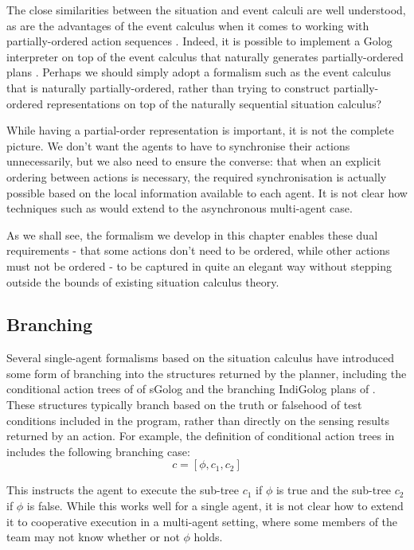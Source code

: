 The close similarities between the situation and event calculi are
well understood, as are the advantages of the event calculus when
it comes to working with partially-ordered action sequences \citep{belleghem97sitcalc_evtcalc}.
Indeed, it is possible to implement a Golog interpreter on top of
the event calculus that naturally generates partially-ordered plans
\citep{pereira04ec_golog}. Perhaps we should simply adopt a formalism
such as the event calculus that is naturally partially-ordered, rather
than trying to construct partially-ordered representations on top
of the naturally sequential situation calculus?

While having a partial-order representation is important, it is not
the complete picture. We don't want the agents to have to synchronise
their actions unnecessarily, but we also need to ensure the converse:
that when an explicit ordering between actions is necessary, the required
synchronisation is actually possible based on the local information
available to each agent. It is not clear how techniques such as \citep{pereira04ec_golog}
would extend to the asynchronous multi-agent case.

As we shall see, the formalism we develop in this chapter enables
these dual requirements - that some actions don't need to be ordered,
while other actions must not be ordered - to be captured in quite
an elegant way without stepping outside the bounds of existing situation
calculus theory.


\subsection{Branching}

Several single-agent formalisms based on the situation calculus have
introduced some form of branching into the structures returned by
the planner, including the conditional action trees of of sGolog \citep{lakemeyer99golog_cats}
and the branching IndiGolog plans of \citep{giacomo04sem_delib_indigolog}.
These structures typically branch based on the truth or falsehood
of test conditions included in the program, rather than directly on
the sensing results returned by an action. For example, the definition
of conditional action trees in \citep{lakemeyer99golog_cats} includes
the following branching case:\[
c=[\phi,c_{1},c_{2}]\]


This instructs the agent to execute the sub-tree $c_{1}$ if $\phi$
is true and the sub-tree $c_{2}$ if $\phi$ is false. While this
works well for a single agent, it is not clear how to extend it to
cooperative execution in a multi-agent setting, where some members
of the team may not know whether or not $\phi$ holds.


